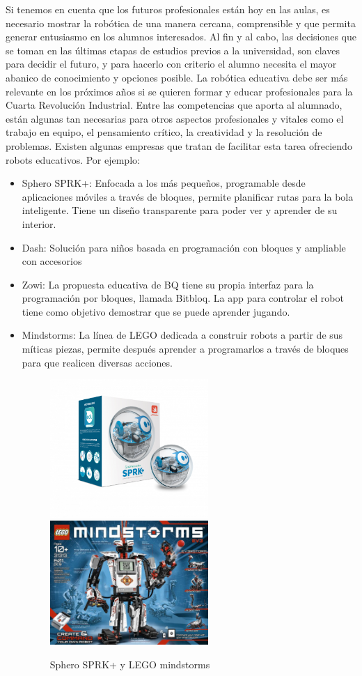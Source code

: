 \documentclass[12pt,spanish,chapterprefix, numbers=noenddot]{book}
\numberwithin{equation}{section}
\numberwithin{figure}{section}
\begin{document}
Si tenemos en cuenta que los futuros profesionales están hoy en las aulas, es necesario mostrar la robótica de una manera cercana, comprensible y que permita generar entusiasmo en los alumnos interesados. Al fin y al cabo, las decisiones que se toman en las últimas etapas de estudios previos a la universidad, son claves para decidir el futuro, y para hacerlo con criterio el alumno necesita el mayor abanico de conocimiento y opciones posible. 
La robótica educativa debe ser más relevante en los próximos años si se quieren formar y educar profesionales para la Cuarta Revolución Industrial. Entre las competencias que aporta al alumnado, están algunas tan necesarias para otros aspectos profesionales y vitales como el trabajo en equipo, el pensamiento crítico, la creatividad y la resolución de problemas. Existen algunas empresas que tratan de facilitar esta tarea ofreciendo robots educativos. Por ejemplo: 
\begin{itemize}
    \item Sphero SPRK+: Enfocada a los más pequeños, programable desde aplicaciones móviles a través de bloques, permite planificar rutas para la bola inteligente. Tiene un diseño transparente para poder ver y aprender de su interior.  
    \item Dash: Solución para niños basada en programación con bloques y ampliable con accesorios 
    \item Zowi: La propuesta educativa de BQ tiene su propia interfaz para la programación por bloques, llamada Bitbloq. La app para controlar el robot tiene como objetivo demostrar que se puede aprender jugando.
    \item Mindstorms: La línea de LEGO dedicada a construir robots a partir de sus míticas piezas, permite después aprender a programarlos a través de bloques para que realicen diversas acciones. 
    \begin{figure}[h!]
    \centering
    \includegraphics[width=6cm]{Figs/spheroedu-sprkplus.png}
    \includegraphics[width=6cm]{Figs/mindstorms.jpg}
    \par
    \caption{\label{fig:sphero}Sphero SPRK+ y LEGO mindstorms}
    \end{figure}
\end{itemize}
\end{document}
